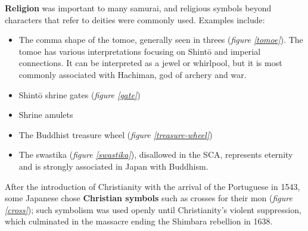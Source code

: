 \documentclass{article}
\begin{document}
  \begin{figure}
  \begin{subfigs}
  \end{subfigs}
  \begin{subfigs}
  \end{subfigs}
  \end{figure}
  
  \textbf{Religion} was important to many samurai, and religious symbols
  beyond characters that refer to deities were commonly used.  Examples
  include:
  
\begin{itemize}
\item The comma shape of the tomoe, generally seen in threes (\emph{figure
  \ref{tomoe}}).  The tomoe has various
  interpretations focusing on Shintō and imperial connections.  It can
  be interpreted as a jewel or whirlpool, but it is most commonly
  associated with Hachiman, god of archery and war.
\item Shint\=o shrine gates (\emph{figure \ref{gate}})
\item Shrine amulets
\item The Buddhist treasure wheel (\emph{figure \ref{treasure-wheel}})
\item The swastika (\emph{figure \ref{swastika}}), 
  disallowed in the SCA, represents eternity and is strongly
  associated in Japan with Buddhism.
\end{itemize}

  After the introduction of Christianity with the arrival of the
  Portuguese in 1543, some Japanese chose \textbf{Christian symbols} such
  as crosses for their mon (\emph{figure \ref{cross}});
   such symbolism was used openly until Christianity's violent
  suppression, which culminated in the massacre ending the Shimbara
  rebellion in 1638.
\end{document}

